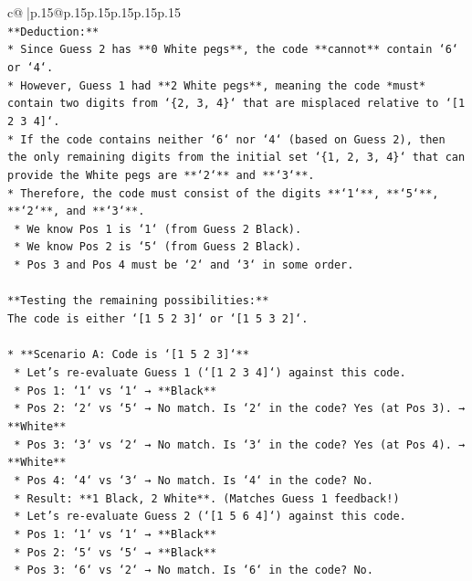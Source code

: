 \documentclass{article}
\begin{document}
{\begin{supertabular}{c@{$\;$}|p{.15\linewidth}@{}p{.15\linewidth}p{.15\linewidth}p{.15\linewidth}p{.15\linewidth}p{.15\linewidth}}
{{{\\ 
\texttt{**Deduction:**} \\
\texttt{*   Since Guess 2 has **0 White pegs**, the code **cannot** contain `6` or `4`.} \\
\texttt{*   However, Guess 1 had **2 White pegs**, meaning the code *must* contain two digits from `\{2, 3, 4\}` that are misplaced relative to `{[}1 2 3 4{]}`.} \\
\texttt{*   If the code contains neither `6` nor `4` (based on Guess 2), then the only remaining digits from the initial set `\{1, 2, 3, 4\}` that can provide the White pegs are **`2`** and **`3`**.} \\
\texttt{*   Therefore, the code must consist of the digits **`1`**, **`5`**, **`2`**, and **`3`**.} \\
\texttt{    *   We know Pos 1 is `1` (from Guess 2 Black).} \\
\texttt{    *   We know Pos 2 is `5` (from Guess 2 Black).} \\
\texttt{    *   Pos 3 and Pos 4 must be `2` and `3` in some order.} \\
\\ 
\texttt{**Testing the remaining possibilities:**} \\
\texttt{The code is either `{[}1 5 2 3{]}` or `{[}1 5 3 2{]}`.} \\
\\ 
\texttt{*   **Scenario A: Code is `{[}1 5 2 3{]}`**} \\
\texttt{    *   Let's re{-}evaluate Guess 1 (`{[}1 2 3 4{]}`) against this code.} \\
\texttt{        *   Pos 1: `1` vs `1` → **Black**} \\
\texttt{        *   Pos 2: `2` vs `5` → No match. Is `2` in the code? Yes (at Pos 3). → **White**} \\
\texttt{        *   Pos 3: `3` vs `2` → No match. Is `3` in the code? Yes (at Pos 4). → **White**} \\
\texttt{        *   Pos 4: `4` vs `3` → No match. Is `4` in the code? No.} \\
\texttt{        *   Result: **1 Black, 2 White**. (Matches Guess 1 feedback!)} \\
\texttt{    *   Let's re{-}evaluate Guess 2 (`{[}1 5 6 4{]}`) against this code.} \\
\texttt{        *   Pos 1: `1` vs `1` → **Black**} \\
\texttt{        *   Pos 2: `5` vs `5` → **Black**} \\
\texttt{        *   Pos 3: `6` vs `2` → No match. Is `6` in the code? No.} \\
}}}
\end{supertabular}}
\end{document}
